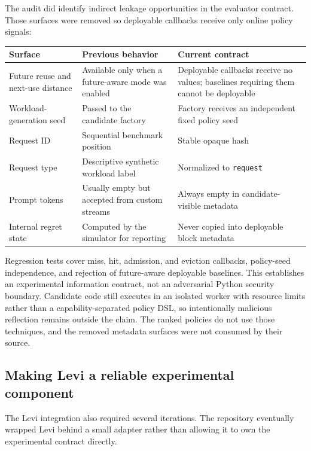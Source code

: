 \documentclass[11pt]{article}
\newcommand{\identifier}[1]{\nolinkurl{#1}}
\begin{document}
The audit did identify indirect leakage opportunities in the evaluator contract.
Those surfaces were removed so deployable callbacks receive only online policy
signals:

\begin{center}
\small
\begin{tabularx}{\textwidth}{@{}p{}XX@{}}
\toprule
\textbf{Surface} & \textbf{Previous behavior} & \textbf{Current contract} \\
\midrule
Future reuse and next-use distance &
Available only when a future-aware mode was enabled &
Deployable callbacks receive no values; baselines requiring them cannot be deployable \\
Workload-generation seed &
Passed to the candidate factory &
Factory receives an independent fixed policy seed \\
Request ID &
Sequential benchmark position &
Stable opaque hash \\
Request type &
Descriptive synthetic workload label &
Normalized to \identifier{request} \\
Prompt tokens &
Usually empty but accepted from custom streams &
Always empty in candidate-visible metadata \\
Internal regret state &
Computed by the simulator for reporting &
Never copied into deployable block metadata \\
\bottomrule
\end{tabularx}
\end{center}

Regression tests cover miss, hit, admission, and eviction callbacks, policy-seed
independence, and rejection of future-aware deployable baselines.  This establishes an
experimental information contract, not an adversarial Python security boundary.
Candidate code still executes in an isolated worker with resource limits rather than a
capability-separated policy DSL, so intentionally malicious reflection remains outside
the claim.  The ranked policies do not use those techniques, and the removed metadata
surfaces were not consumed by their source.

\subsection{Making Levi a reliable experimental component}

The Levi integration also required several iterations.  The repository eventually
wrapped Levi behind a small adapter rather than allowing it to own the experimental
contract directly.
\end{document}
